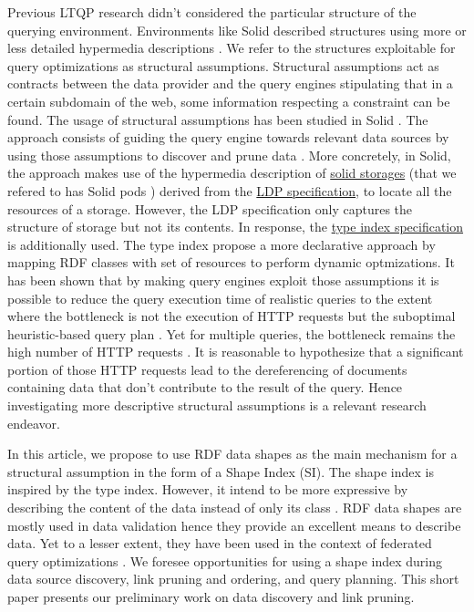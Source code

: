 Previous LTQP research didn't considered the particular structure of the querying environment.
Environments like Solid described structures using more or less detailed hypermedia descriptions \cite{Fielding}.
We refer to the structures exploitable for query optimizations as structural assumptions.
Structural assumptions act as contracts between the data provider and 
the query engines stipulating that in a certain subdomain of the web, some information respecting a constraint can be found.
The usage of structural assumptions has been studied in Solid \cite{Taelman2023}.
The approach consists of guiding the query engine towards relevant data sources by using 
those assumptions to discover and prune data \cite{verborgh2020guided}.
More concretely, in Solid, the approach makes use of the hypermedia description of 
\href{https://solidproject.org/TR/protocol#resources}{solid storages} (that we refered to has Solid pods \cite{Taelman2023})
derived from the \href{https://www.w3.org/TR/ldp/}{LDP specification},
to locate all the resources of a storage.
However, the LDP specification only captures the structure of storage but not its contents.
In response, the \href{https://solid.github.io/type-indexes/}{type index specification} is additionally used.
The type index propose a more declarative approach \cite{Taelman2017} by mapping RDF classes with set of resources to perform dynamic optmizations.
It has been shown that by making query engines exploit those assumptions it is possible to reduce the query execution time
of realistic queries to the extent where the bottleneck is not the execution of 
HTTP requests but the suboptimal heuristic-based query plan \cite{eschauzier_quweda_2023, Taelman2023}.
Yet for multiple queries, the bottleneck remains the high number of HTTP requests  \cite{eschauzier_quweda_2023}.
It is reasonable to hypothesize that a significant portion of those HTTP requests lead to the dereferencing of
documents containing data that don't contribute to the result of the query.
Hence investigating more descriptive structural assumptions is a relevant research endeavor.

In this article, we propose to use RDF data shapes as the main mechanism for a structural assumption in the form of a Shape Index (SI).
The shape index is inspired by the type index.
However, it intend to be more expressive by describing the content of the data instead of only its class \cite{Taelman2017}.
RDF data shapes are mostly used in data validation \cite{Gayo2018a} hence they provide an excellent means to describe data.
Yet to a lesser extent, they have been used in the context of federated query optimizations \cite{kashif2021}.
We foresee opportunities for using a shape index during data source discovery, link pruning and ordering, and query planning.
This short paper presents our preliminary work on data discovery and link pruning.